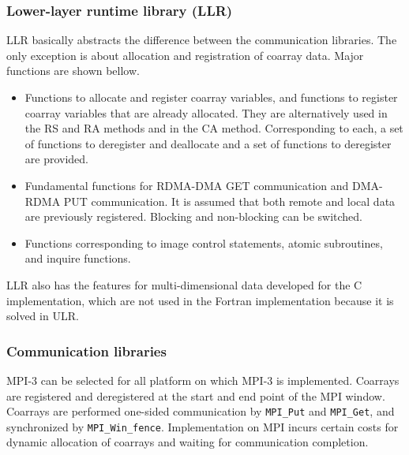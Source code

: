 \subsubsection{Lower-layer runtime library (LLR)}

LLR basically abstracts the difference between the communication libraries.
The only exception is about allocation and registration of coarray data.
Major functions are shown bellow.

\begin{itemize}
\item
Functions to allocate and register coarray variables,
and functions to register coarray variables that are already allocated.
They are alternatively used in the RS and RA methods and in the CA method.
Corresponding to each, a set of functions to deregister and deallocate and
a set of functions to deregister are provided.

\item
Fundamental functions for RDMA-DMA GET communication and DMA-RDMA PUT communication.
It is assumed that both remote and local data are previously registered.
Blocking and non-blocking can be switched.

\item
Functions corresponding to image control statements, atomic subroutines,
and inquire functions.

\end{itemize}

LLR also has the features for multi-dimensional data developed for the C 
implementation, which are not used in the Fortran implementation because
it is solved in ULR.


\subsubsection{Communication libraries}

MPI-3 can be selected for all platform on which MPI-3 is implemented. Coarrays are 
registered and deregistered at the start and end point of the MPI window. 
Coarrays are performed one-sided communication by {\tt MPI\_Put} and {\tt MPI\_Get},
and synchronized by {\tt MPI\_Win\_fence}. 
Implementation on MPI incurs certain costs for dynamic allocation of coarrays and 
waiting for communication completion.

